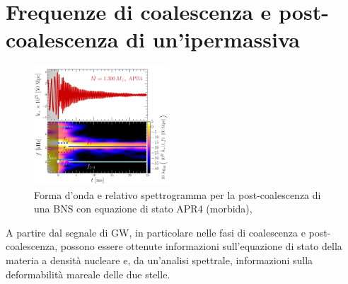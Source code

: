 \section[Frequenze caratteristiche]{Frequenze  di coalescenza e post-coalescenza di un'ipermassiva}
\label{section:frequenze_caratteristiche}
\begin{figure}
	\vspace{-25pt}
	\begin{center}
		\includegraphics[width=0.45\textwidth]{figures/Capitolo_1/GW_spectrogram_APR4-q10-M1300.pdf}
	\end{center}
	\vspace{-10pt}
	\caption{Forma d'onda e relativo spettrogramma per la post-coalescenza di una BNS con equazione di stato APR4 (morbida), \cite{Rezzolla_2016}}
	\label{fig:spettrogramma_postmerger_APR4}
	\vspace{-20pt}
\end{figure}
A partire dal segnale di GW, in particolare nelle fasi di coalescenza e post-coalescenza, possono essere ottenute informazioni sull'equazione di stato della materia a densità nucleare e, da un'analisi spettrale, informazioni sulla deformabilità mareale delle due stelle.\\
